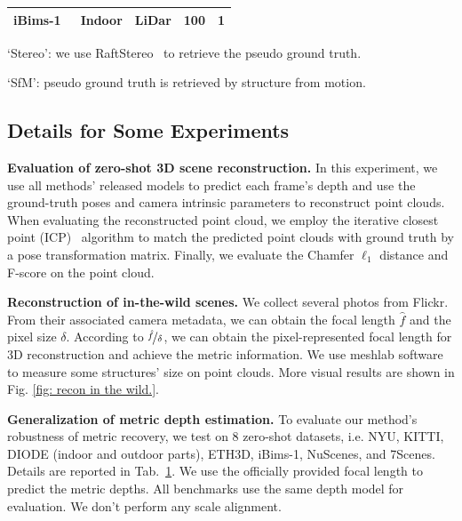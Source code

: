 \begin{table}[]
\begin{threeparttable}
{\begin{tabular}{ r llll}
\multicolumn{1}{l|}{iBims-1~\cite{koch2018evaluation}}                        & \multicolumn{1}{l|}{Indoor}         & \multicolumn{1}{l|}{LiDar}                & \multicolumn{1}{l|}{100}           & 1              \\
\toprule[1pt]
\end{tabular}}
\begin{tablenotes}
\footnotesize
\item[\dag]`Stereo': we use RaftStereo~\cite{lipson2021raft} to retrieve the pseudo ground truth.
\item[\ddag]`SfM': pseudo ground truth is retrieved by structure from motion.
\end{tablenotes}
\end{threeparttable}
\label{table: datasets}
\end{table}

\subsection{Details for Some Experiments}
\noindent\textbf{Evaluation of zero-shot 3D scene reconstruction.} In this experiment, we use all methods' released models to predict each frame's depth and use the ground-truth poses and camera intrinsic parameters to reconstruct point clouds. When evaluating the reconstructed point cloud, we employ the iterative closest point (ICP)~\cite{besl1992method} algorithm to match the predicted point clouds with ground truth by a pose transformation matrix. Finally, we evaluate the Chamfer $\ell_1$ distance and F-score on the point cloud.

\noindent\textbf{Reconstruction of in-the-wild scenes.} We collect several photos from Flickr. From their associated camera metadata, we can obtain the focal length $\hat{f}$ and the pixel size $\delta$. According to $\nicefrac{\hat{f}}{\delta}$, we can obtain the pixel-represented focal length for 3D reconstruction and achieve the metric information. We use meshlab software to measure some structures' size on point clouds. More visual results are shown in Fig. \ref{fig: recon in the wild.}.

\noindent\textbf{Generalization of metric depth estimation.} To evaluate our method's robustness of metric recovery, we test on 8 zero-shot datasets, i.e. NYU, KITTI, DIODE (indoor and outdoor parts), ETH3D, iBims-1, NuScenes, and 7Scenes. Details are reported in Tab.~\ref{table: datasets}.  We use the officially provided focal length to predict the metric depths. All benchmarks use the same depth model for evaluation. We don't perform any scale alignment.  

